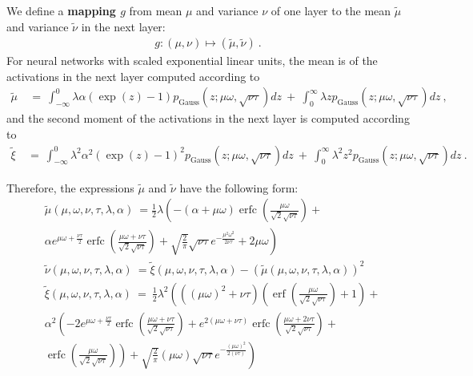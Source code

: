 \documentclass{article}
\newcommand\munn{{\tilde \mu}}
\newcommand\nunn{{\tilde \nu}}
\newcommand\xinn{{\tilde \xi}}
\DeclareMathOperator{\erfc}{erfc}
\DeclareMathOperator{\erf}{erf}
\begin{document}
We define a {\bf mapping $g$} from mean $\mu$ and
variance $\nu$ of one layer 
to the mean $\munn$ and  variance  $\nunn$ in the next layer:
\begin{align}
\label{eq:mapping}
g: (\mu,\nu) \mapsto (\munn,\nunn) \ .
\end{align}
For neural networks with scaled exponential linear units, 
the mean is of the activations in the next layer computed according to
\begin{align}
\munn \ &= \ \int_{-\infty}^{0} \lambda \alpha (\exp(z)- 1)
  p_{\mathrm{Gauss}}(z; \mu \omega ,\sqrt{\nu \tau}) dz \ + \ 
\int_{0}^{\infty} \lambda  z  p_{\mathrm{Gauss}}(z; \mu \omega ,\sqrt{\nu \tau}) dz \ ,
\end{align}
and the second moment of the activations in the next layer is computed according to
\begin{align}
\xinn \ &= \ \int_{-\infty}^{0} \lambda^2 \alpha^2 (\exp (z)- 1)^2
  p_{\mathrm{Gauss}}(z; \mu \omega ,\sqrt{\nu \tau}) dz \ + \ 
\int_{0}^{\infty} \lambda^2  z^2  p_{\mathrm{Gauss}}(z; \mu \omega ,\sqrt{\nu \tau}) dz \ .
\end{align}

Therefore, the expressions $\munn$ and $\nunn$ have the following form: 
\begin{align} 
&\munn(\mu,\omega,\nu,\tau, \lambda ,\alpha ) \
  = \frac{1}{2} \lambda  \left(-(\alpha +\mu  \omega ) \erfc \left(\frac{\mu  \omega }{\sqrt{2} \sqrt{\nu  \tau }}\right)+ \right. \\ \nonumber & \left.
    \alpha  e^{\mu  \omega +\frac{\nu  \tau }{2}} \erfc 
    \left(\frac{\mu  \omega +\nu  \tau }{\sqrt{2} \sqrt{\nu  \tau }}\right)+ 
    \sqrt{\frac{2}{\pi }} \sqrt{\nu  \tau } e^{-\frac{\mu ^2 \omega ^2}{2 \nu  \tau }}+2 \mu  \omega \right) \\  
&\nunn(\mu, \omega,\nu,\tau,\lambda ,\alpha )
  \ = \xinn(\mu, \omega,\nu,\tau,\lambda ,\alpha ) - \left( \munn(\mu,\omega,\nu,\tau, \lambda ,\alpha ) \right)^2 \\
\label{eq:mappingSecondMom}
&\xinn(\mu, \omega,\nu,\tau,\lambda ,\alpha )
  \ = \ \frac{1}{2} \lambda ^2 \left(\left((\mu \omega)^2+\nu \tau \right) 
  \left(\erf  \left(\frac{\mu \omega}{\sqrt{2}
  \sqrt{\nu \tau}}\right)+1\right)+\right. \\ \nonumber
 &\left. \alpha ^2 \left(-2 e^{\mu \omega+\frac{\nu \tau}{2}} \erfc \left(\frac{\mu \omega+\nu \tau}{\sqrt{2} \sqrt{\nu \tau}}\right)
 + e ^{2 (\mu \omega+\nu \tau)} \erfc \left(\frac{\mu \omega+2 \nu \tau}{\sqrt{2} \sqrt{\nu \tau}}\right)+\right.\right. \\ \nonumber
 &\left.\left. \erfc \left(\frac{\mu \omega}{\sqrt{2} \sqrt{\nu \tau}}\right)\right)+\sqrt{\frac{2}{\pi }} (\mu \omega) \sqrt{\nu \tau} 
 e^{-\frac{(\mu \omega)^2}{2 (\nu \tau)}}\right) 
\end{align}
\end{document}
